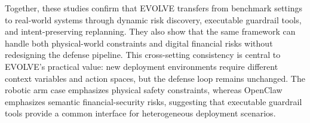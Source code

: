 Together, these studies confirm that EVOLVE transfers from benchmark settings to real-world systems through dynamic risk discovery, executable guardrail tools, and intent-preserving replanning. They also show that the same framework can handle both physical-world constraints and digital financial risks without redesigning the defense pipeline. This cross-setting consistency is central to EVOLVE's practical value: new deployment environments require different context variables and action spaces, but the defense loop remains unchanged. The robotic arm case emphasizes physical safety constraints, whereas OpenClaw emphasizes semantic financial-security risks, suggesting that executable guardrail tools provide a common interface for heterogeneous deployment scenarios.



